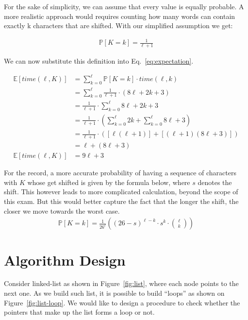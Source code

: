 \documentclass{article}
\begin{document}
For the sake of simplicity, we can assume that every value is equally
probable. A more realistic approach would requires counting how many
words can contain exactly k characters that are shifted. With our
simplified assumption we get:

\begin{align*}
  \mathbb{P}[K=k] = \frac{1}{\ell+1}
\end{align*}

We can now substitute this definition into Eq.~\ref{eq:expectation}.

\begin{align*}
  \mathbb{E}[time(\ell, K)] & = \sum_{k=0}^{\ell} \mathbb{P}[K=k] \cdot time(\ell, k)  \\
                            & = \sum_{k=0}^{\ell} \frac{1}{\ell+1} \cdot \left( 8\ell+2k+3 \right)  \\
                            & = \frac{1}{\ell+1} \cdot \sum_{k=0}^{\ell} 8\ell+2k+3  \\
                            & = \frac{1}{\ell+1} \cdot \left(\sum_{k=0}^{\ell} 2k + \sum_{k=0}^{\ell} 8\ell + 3 \right)  \\
                            & = \frac{1}{\ell+1} \cdot \left( \left[ \ell\left(\ell+1\right) \right] + \left[\left(\ell+1\right) \left(8\ell + 3\right) \right] \right)  \\
                            & = \ell + (8\ell + 3)  \\
  \mathbb{E}[time(\ell, K)] & = 9\ell + 3
\end{align*}

For the record, a more accurate probability of having a sequence of
characters with $K$ whose get shifted is given by the formula below,
where $s$ denotes the shift. This however leads to more complicated
calculation, beyond the scope of this exam. But this would better
capture the fact that the longer the shift, the closer we move towards
the worst case.
\begin{align*}
  \mathbb{P}[K=k] = \frac{1}{26^\ell} \left( (26-s)^{\ell-k} \cdot s^k \cdot \binom{\ell}{k} \right)
\end{align*}

\section{Algorithm Design}

Consider linked-list as shown in Figure~\ref{fig:list}, where each
node points to the next one. As we build such list, it is possible to
build ``loops'' as shown on Figure~\ref{fig:list-loop}. We would
like to design a procedure to check whether the pointers that make up
the list forms a loop or not.
\end{document}
